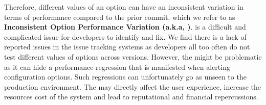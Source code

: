 Therefore, different values of an option can have an inconsistent variation in terms of performance compared to the prior commit, which %
we refer to as \textbf{Inconsistent Option Performance Variation (a.k.a, \inconsistent)}. 
\inconsistent is a difficult and complicated issue for developers to identify and fix. We find there is a lack of reported \inconsistent issues in the issue tracking systems as developers all too often do not test different values of options across versions. However, the \inconsistent might be problematic as it can hide a performance regression that is manifested when alerting configuration options. %
Such regressions can unfortunately go as unseen to the production environment. The \inconsistent may directly affect the user experience, increase the resources cost of the system and lead to reputational and financial repercussions. 


